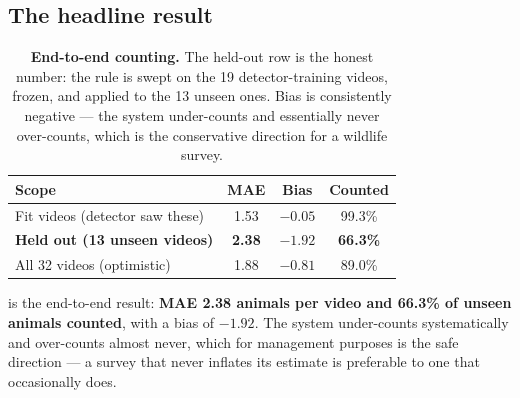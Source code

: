 \subsection{The headline result}

\begin{table}[t]
\centering\small
\setlength{\tabcolsep}{4pt}
\begin{tabular}{lccc}
\toprule
Scope & MAE & Bias & Counted \\
\midrule
Fit videos (detector saw these) & 1.53 & $-0.05$ & 99.3\% \\
\textbf{Held out (13 unseen videos)} & \textbf{2.38} & $\mathbf{-1.92}$ & \textbf{66.3\%} \\
All 32 videos (optimistic) & 1.88 & $-0.81$ & 89.0\% \\
\bottomrule
\end{tabular}
\caption{\textbf{End-to-end counting.} The held-out row is the honest number: the rule is
swept on the 19 detector-training videos, frozen, and applied to the 13 unseen ones. Bias is
consistently negative --- the system under-counts and essentially never over-counts, which is
the conservative direction for a wildlife survey.}
\label{tab:counting}
\end{table}

 is the end-to-end result: \textbf{MAE 2.38 animals per video and 66.3\%
of unseen animals counted}, with a bias of $-1.92$. The system under-counts systematically
and over-counts almost never, which for management purposes is the safe direction --- a
survey that never inflates its estimate is preferable to one that occasionally does.

